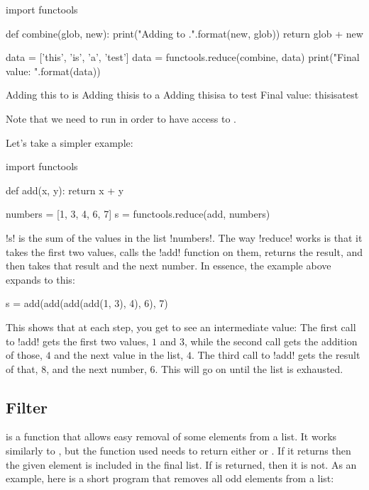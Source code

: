 \documentclass[11pt]{cselabheader}
\begin{document}
\begin{python3code}
import functools

def combine(glob, new):
    print("Adding {} to {}.".format(new, glob))
    return glob + new

data = ['this', 'is', 'a', 'test']
data = functools.reduce(combine, data)
print("Final value: {}".format(data))
\end{python3code}

\begin{python3code}
Adding this to is
Adding thisis to a
Adding thisisa to test
Final value: thisisatest
\end{python3code}

Note that we need to run  in order to have access to
.

Let's take a simpler example:
\begin{python3code}
import functools

def add(x, y):
  return x + y

numbers = [1, 3, 4, 6, 7]
s = functools.reduce(add, numbers)
\end{python3code}

\pythoninline!s! is the sum of the values in the list \pythoninline!numbers!. The way
\pythoninline!reduce! works is that it takes the first two values, calls the
\pythoninline!add! function on them, returns the result, and then takes that result
and the next number. In essence, the example above expands to this:
\begin{python3code}
s = add(add(add(add(1, 3), 4), 6), 7)
\end{python3code}

This shows that at each step, you get to see an intermediate value: The first
call to \pythoninline!add! gets the first two values, $1$ and $3$, while the second
call gets the addition of those, $4$ and the next value in the list, $4$. The
third call to \pythoninline!add! gets the result of that, $8$, and the next number,
$6$. This will go on until the list is exhausted.

\subsection{Filter}
\label{subsec:filter}
 is a function that allows easy removal of some elements from
a list. It works similarly to , but the function used needs to
return either  or . If it returns
 then the given element is included in the final list. If
 is returned, then it is not. As an example, here is a short
program that removes all odd elements from a list:
\end{document}
